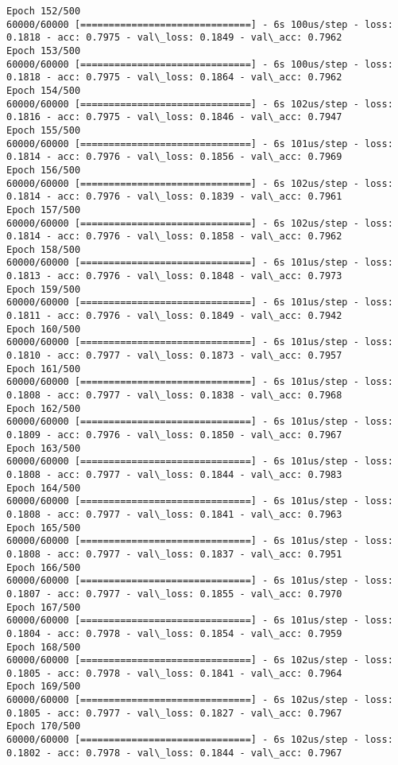 \documentclass[11pt]{article}
\begin{document}
\begin{Verbatim}[commandchars=\\\{\}]
Epoch 152/500
60000/60000 [==============================] - 6s 100us/step - loss: 0.1818 - acc: 0.7975 - val\_loss: 0.1849 - val\_acc: 0.7962
Epoch 153/500
60000/60000 [==============================] - 6s 100us/step - loss: 0.1818 - acc: 0.7975 - val\_loss: 0.1864 - val\_acc: 0.7962
Epoch 154/500
60000/60000 [==============================] - 6s 102us/step - loss: 0.1816 - acc: 0.7975 - val\_loss: 0.1846 - val\_acc: 0.7947
Epoch 155/500
60000/60000 [==============================] - 6s 101us/step - loss: 0.1814 - acc: 0.7976 - val\_loss: 0.1856 - val\_acc: 0.7969
Epoch 156/500
60000/60000 [==============================] - 6s 102us/step - loss: 0.1814 - acc: 0.7976 - val\_loss: 0.1839 - val\_acc: 0.7961
Epoch 157/500
60000/60000 [==============================] - 6s 102us/step - loss: 0.1814 - acc: 0.7976 - val\_loss: 0.1858 - val\_acc: 0.7962
Epoch 158/500
60000/60000 [==============================] - 6s 101us/step - loss: 0.1813 - acc: 0.7976 - val\_loss: 0.1848 - val\_acc: 0.7973
Epoch 159/500
60000/60000 [==============================] - 6s 101us/step - loss: 0.1811 - acc: 0.7976 - val\_loss: 0.1849 - val\_acc: 0.7942
Epoch 160/500
60000/60000 [==============================] - 6s 101us/step - loss: 0.1810 - acc: 0.7977 - val\_loss: 0.1873 - val\_acc: 0.7957
Epoch 161/500
60000/60000 [==============================] - 6s 101us/step - loss: 0.1808 - acc: 0.7977 - val\_loss: 0.1838 - val\_acc: 0.7968
Epoch 162/500
60000/60000 [==============================] - 6s 101us/step - loss: 0.1809 - acc: 0.7976 - val\_loss: 0.1850 - val\_acc: 0.7967
Epoch 163/500
60000/60000 [==============================] - 6s 101us/step - loss: 0.1808 - acc: 0.7977 - val\_loss: 0.1844 - val\_acc: 0.7983
Epoch 164/500
60000/60000 [==============================] - 6s 101us/step - loss: 0.1808 - acc: 0.7977 - val\_loss: 0.1841 - val\_acc: 0.7963
Epoch 165/500
60000/60000 [==============================] - 6s 101us/step - loss: 0.1808 - acc: 0.7977 - val\_loss: 0.1837 - val\_acc: 0.7951
Epoch 166/500
60000/60000 [==============================] - 6s 101us/step - loss: 0.1807 - acc: 0.7977 - val\_loss: 0.1855 - val\_acc: 0.7970
Epoch 167/500
60000/60000 [==============================] - 6s 101us/step - loss: 0.1804 - acc: 0.7978 - val\_loss: 0.1854 - val\_acc: 0.7959
Epoch 168/500
60000/60000 [==============================] - 6s 102us/step - loss: 0.1805 - acc: 0.7978 - val\_loss: 0.1841 - val\_acc: 0.7964
Epoch 169/500
60000/60000 [==============================] - 6s 102us/step - loss: 0.1805 - acc: 0.7977 - val\_loss: 0.1827 - val\_acc: 0.7967
Epoch 170/500
60000/60000 [==============================] - 6s 102us/step - loss: 0.1802 - acc: 0.7978 - val\_loss: 0.1844 - val\_acc: 0.7967

\end{Verbatim}
\end{document}
